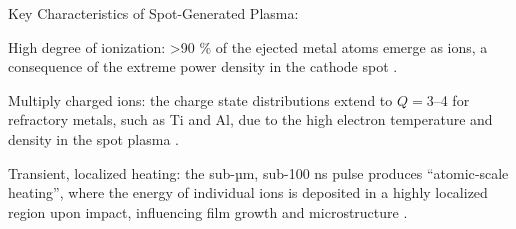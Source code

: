 Key Characteristics of Spot-Generated Plasma:
\begin{compactitem}
    \item High degree of ionization: >90 \% of the ejected metal atoms emerge as ions, a consequence of the extreme power density in the cathode spot \cite[Chap.~3.5]{cathodic_arcs}.
    \item Multiply charged ions: the charge state distributions extend to \(Q=3\)–4 for refractory metals, such as Ti and Al, due to the high electron temperature and density in the spot plasma \cite[Chap.~3.5]{cathodic_arcs}.
    \item Transient, localized heating: the sub-µm, sub-100 ns pulse produces “atomic‐scale heating”, where the energy of individual ions is deposited in a highly localized region upon impact, influencing film growth and microstructure \cite[Chap.~3.6]{cathodic_arcs}.
\end{compactitem}

